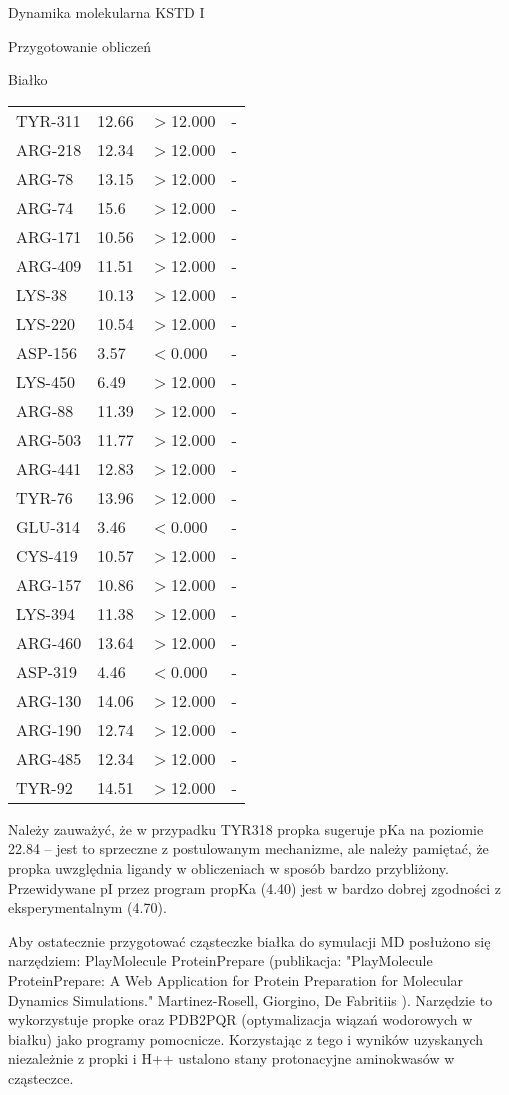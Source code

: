 \begin{section}{Dynamika molekularna KSTD I}
\begin{subsection}{Przygotowanie obliczeń}
\begin{subsubsection}{Białko}
\begin{longtable}{| p{} | p{} | p{} | p{} |}
TYR-311 & 12.66 & $>$12.000 & -\\
ARG-218 & 12.34 & $>$12.000 & -\\
ARG-78 & 13.15 & $>$12.000 & -\\
ARG-74 & 15.6 & $>$12.000 & -\\
ARG-171 & 10.56 & $>$12.000 & -\\
ARG-409 & 11.51 & $>$12.000 & -\\
LYS-38 & 10.13 & $>$12.000 & -\\
LYS-220 & 10.54 & $>$12.000 & -\\
ASP-156 & 3.57 & $<$0.000 & -\\
LYS-450 & 6.49 & $>$12.000 & -\\
ARG-88 & 11.39 & $>$12.000 & -\\
ARG-503 & 11.77 & $>$12.000 & -\\
ARG-441 & 12.83 & $>$12.000 & -\\
TYR-76 & 13.96 & $>$12.000 & -\\
GLU-314 & 3.46 & $<$0.000 & -\\
CYS-419 & 10.57 & $>$12.000 & -\\
ARG-157 & 10.86 & $>$12.000 & -\\
LYS-394 & 11.38 & $>$12.000 & -\\
ARG-460 & 13.64 & $>$12.000 & -\\
ASP-319 & 4.46 & $<$0.000 & -\\
ARG-130 & 14.06 & $>$12.000 & -\\
ARG-190 & 12.74 & $>$12.000 & -\\
ARG-485 & 12.34 & $>$12.000 & -\\
TYR-92 & 14.51 & $>$12.000 & -\\
 \hline
 \end{longtable}
 
 Należy zauważyć, że w przypadku TYR318 propka sugeruje pKa na poziomie 22.84 -- jest to sprzeczne z postulowanym mechanizme, ale należy pamiętać, że propka 
 uwzględnia ligandy w obliczeniach w sposób bardzo przybliżony. Przewidywane pI przez program propKa (4.40) jest w bardzo dobrej zgodności z eksperymentalnym (4.70).
 
 Aby ostatecznie przygotować cząsteczke białka do symulacji MD posłużono się narzędziem: PlayMolecule ProteinPrepare (publikacja: "PlayMolecule ProteinPrepare:
 A Web Application for Protein Preparation for Molecular Dynamics Simulations." Martinez-Rosell, Giorgino, De Fabritiis ).
 Narzędzie to wykorzystuje propke oraz PDB2PQR (optymalizacja wiązań wodorowych w białku) jako programy pomocnicze. Korzystając z tego i wyników uzyskanych niezależnie z propki i H++
 ustalono stany protonacyjne aminokwasów w cząsteczce.
 

\end{subsubsection}
\end{subsection}
\end{section}
